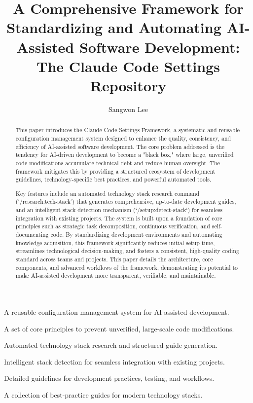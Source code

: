 \documentclass[preprint,12pt]{elsarticle}
\begin{document}
\begin{frontmatter}

\title{A Comprehensive Framework for Standardizing and Automating AI-Assisted Software Development: The Claude Code Settings Repository}

\author[label1]{Sangwon Lee}


\begin{abstract}
This paper introduces the Claude Code Settings Framework, a systematic and reusable configuration management system designed to enhance the quality, consistency, and efficiency of AI-assisted software development. The core problem addressed is the tendency for AI-driven development to become a "black box," where large, unverified code modifications accumulate technical debt and reduce human oversight. The framework mitigates this by providing a structured ecosystem of development guidelines, technology-specific best practices, and powerful automated tools.

Key features include an automated technology stack research command (`/research:tech-stack`) that generates comprehensive, up-to-date development guides, and an intelligent stack detection mechanism (`/setup:detect-stack`) for seamless integration with existing projects. The system is built upon a foundation of core principles such as strategic task decomposition, continuous verification, and self-documenting code. By standardizing development environments and automating knowledge acquisition, this framework significantly reduces initial setup time, streamlines technological decision-making, and fosters a consistent, high-quality coding standard across teams and projects. This paper details the architecture, core components, and advanced workflows of the framework, demonstrating its potential to make AI-assisted development more transparent, verifiable, and maintainable.
\end{abstract}

\begin{highlights}
\item A reusable configuration management system for AI-assisted development.
\item A set of core principles to prevent unverified, large-scale code modifications.
\item Automated technology stack research and structured guide generation.
\item Intelligent stack detection for seamless integration with existing projects.
\item Detailed guidelines for development practices, testing, and workflows.
\item A collection of best-practice guides for modern technology stacks.
\end{highlights}


\end{frontmatter}
\end{document}

